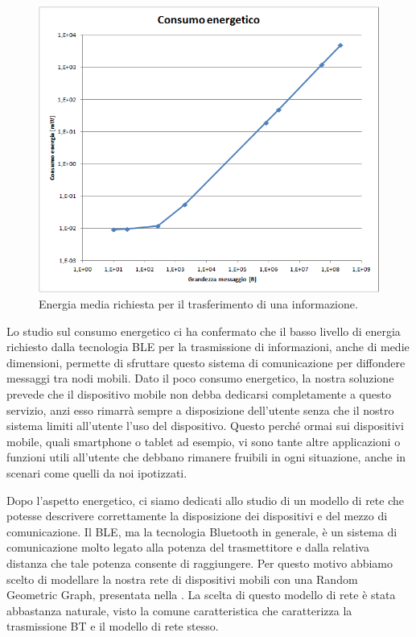 \begin{figure}[tbh]
	\centering
	\includegraphics[width=0.7\linewidth]{Images/studio_energetico/cons_en_sing_tx}
	\caption[Studio energetico]{Energia media richiesta per il trasferimento di una informazione.}
	\label{fig:cons_en_sing_tx}
\end{figure}
\bigskip

Lo studio sul consumo energetico ci ha confermato che il basso livello di energia richiesto dalla tecnologia BLE per la trasmissione di informazioni, anche di medie dimensioni, permette di sfruttare questo sistema di comunicazione per diffondere messaggi tra nodi mobili. Dato il poco consumo energetico, la nostra soluzione prevede che il dispositivo mobile non debba dedicarsi completamente a questo servizio, anzi esso rimarrà sempre a disposizione dell'utente senza che il nostro sistema limiti all'utente l'uso del dispositivo. Questo perché ormai sui dispositivi mobile, quali smartphone o tablet ad esempio, vi sono tante altre applicazioni o funzioni utili all'utente che debbano rimanere fruibili in ogni situazione, anche in scenari come quelli da noi ipotizzati.

Dopo l'aspetto energetico, ci siamo dedicati allo studio di un modello di rete che potesse descrivere correttamente la disposizione dei dispositivi e del mezzo di comunicazione. Il BLE, ma la tecnologia Bluetooth in generale, è un sistema di comunicazione molto legato alla potenza del trasmettitore e dalla relativa distanza che tale potenza consente di raggiungere. Per questo motivo abbiamo scelto di modellare la nostra rete di dispositivi mobili con una Random Geometric Graph, presentata nella . La scelta di questo modello di rete è stata abbastanza naturale, visto la comune caratteristica che caratterizza la trasmissione \acs{BT} e il modello di rete stesso.

